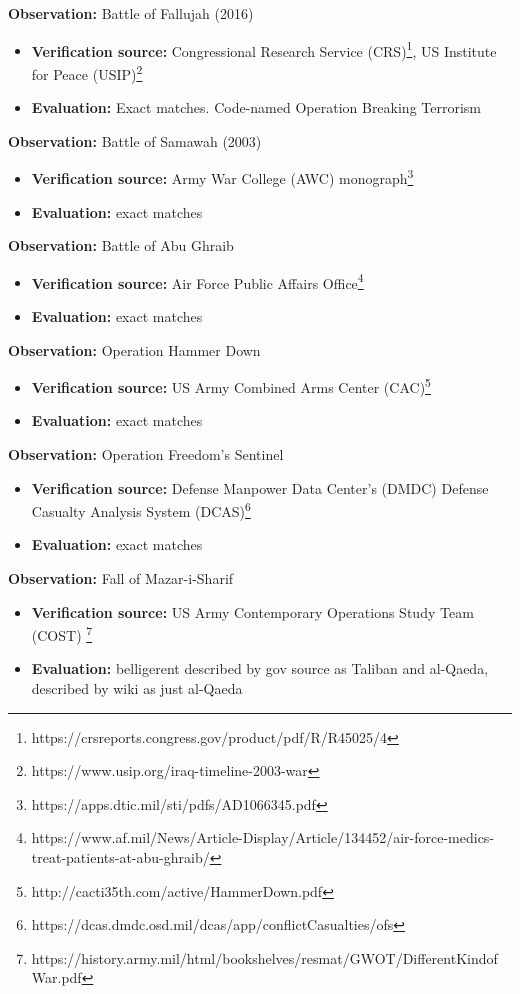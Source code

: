 \documentclass[fleqn,12pt]{article}
\begin{document}
\textbf{Observation:} Battle of Fallujah (2016)
\begin{itemize}
    \item \textbf{Verification source:} Congressional Research Service (CRS)\footnote{https://crsreports.congress.gov/product/pdf/R/R45025/4}, US Institute for Peace (USIP)\footnote{https://www.usip.org/iraq-timeline-2003-war}
    \item \textbf{Evaluation:} Exact matches. Code-named Operation Breaking Terrorism
\end{itemize}

\textbf{Observation:} Battle of Samawah (2003)
\begin{itemize}
    \item \textbf{Verification source:} Army War College (AWC) monograph\footnote{https://apps.dtic.mil/sti/pdfs/AD1066345.pdf}
    \item \textbf{Evaluation:} exact matches
\end{itemize}

\textbf{Observation:} Battle of Abu Ghraib
\begin{itemize}
    \item \textbf{Verification source:} Air Force Public Affairs Office\footnote{https://www.af.mil/News/Article-Display/Article/134452/air-force-medics-treat-patients-at-abu-ghraib/}
    \item \textbf{Evaluation:} exact matches
\end{itemize}

\textbf{Observation:} Operation Hammer Down
\begin{itemize}
    \item \textbf{Verification source:} US Army Combined Arms Center (CAC)\footnote{http://cacti35th.com/active/HammerDown.pdf}
    \item \textbf{Evaluation:} exact matches
\end{itemize}

\textbf{Observation:} Operation Freedom's Sentinel
\begin{itemize}
    \item \textbf{Verification source:} Defense Manpower Data Center's (DMDC) Defense Casualty Analysis System (DCAS)\footnote{https://dcas.dmdc.osd.mil/dcas/app/conflictCasualties/ofs}
    \item \textbf{Evaluation:} exact matches
\end{itemize}

\textbf{Observation:} Fall of Mazar-i-Sharif
\begin{itemize}
    \item \textbf{Verification source:} US Army Contemporary Operations Study Team (COST) \footnote{https://history.army.mil/html/bookshelves/resmat/GWOT/DifferentKindofWar.pdf}
    \item \textbf{Evaluation:} belligerent described by gov source as Taliban and al-Qaeda, described by wiki as just al-Qaeda
\end{itemize}
\end{document}
